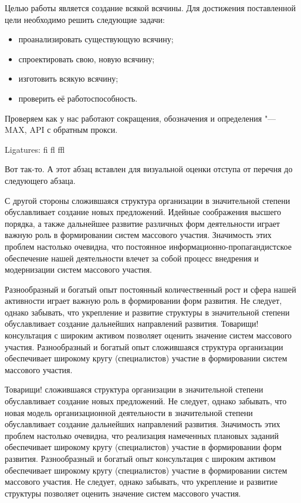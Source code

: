 \Introduction

Целью работы является создание всякой всячины. Для достижения поставленной цели необходимо решить следующие задачи:

\begin{itemize}
\item проанализировать существующую всячину;
\item спроектировать свою, новую всячину;
\item изготовить всякую всячину;
\item проверить её работоспособность.
\end{itemize}

Проверяем как у нас работают сокращения, обозначения и определения "---
MAX, 
API 
с обратным прокси.

Ligatures: fi fl ffl

Вот так-то. А этот абзац вставлен для визуальной оценки отступа от перечня до следующего абзаца.

 С другой стороны сложившаяся структура организации в значительной степени обуславливает создание новых предложений. Идейные соображения высшего порядка, а также дальнейшее развитие различных форм деятельности играет важную роль в формировании систем массового участия. Значимость этих проблем настолько очевидна, что постоянное информационно-пропагандистское обеспечение нашей деятельности влечет за собой процесс внедрения и модернизации систем массового участия.

Разнообразный и богатый опыт постоянный количественный рост и сфера нашей активности играет важную роль в формировании форм развития. Не следует, однако забывать, что укрепление и развитие структуры в значительной степени обуславливает создание дальнейших направлений развития. Товарищи! консультация с широким активом позволяет оценить значение систем массового участия. Разнообразный и богатый опыт сложившаяся структура организации обеспечивает широкому кругу (специалистов) участие в формировании систем массового участия.

Товарищи! сложившаяся структура организации в значительной степени обуславливает создание новых предложений. Не следует, однако забывать, что новая модель организационной деятельности в значительной степени обуславливает создание дальнейших направлений развития. Значимость этих проблем настолько очевидна, что реализация намеченных плановых заданий обеспечивает широкому кругу (специалистов) участие в формировании форм развития. Разнообразный и богатый опыт консультация с широким активом обеспечивает широкому кругу (специалистов) участие в формировании систем массового участия. Не следует, однако забывать, что укрепление и развитие структуры позволяет оценить значение систем массового участия.

